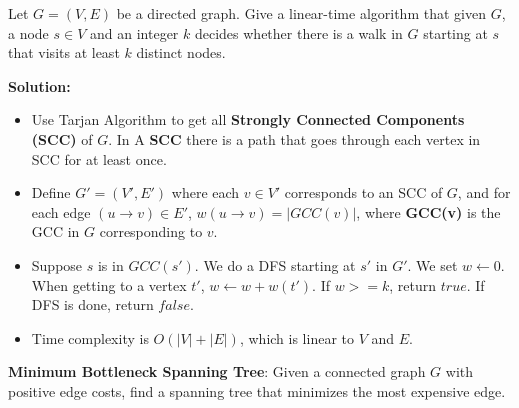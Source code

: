 \documentclass{article}
\newcounter{exercise}
\newcommand{\<}{
    \langle}
\renewcommand{\>}{
    \rangle}
\begin{document}
{\begin{exercise}
Let $G=(V,E)$ be a directed graph. Give a linear-time algorithm that given $G$, a node $s\in V$ and an integer $k$ decides whether there is a walk in $G$ starting at $s$ that visits at least $k$ distinct nodes.
\end{exercise}
\textbf{Solution:} 
    \begin{itemize}
        \item Use Tarjan Algorithm to get all \textbf{Strongly Connected Components (SCC)} of $G$. In A \textbf{SCC} there is a path that goes through each vertex in SCC for at least once.
        \item Define $G'=(V', E')$ where each $v\in V'$ corresponds to an SCC of $G$, and for each edge $(u\rightarrow v) \in E'$, $w(u\rightarrow v)=|GCC(v)|$, where \textbf{GCC(v)} is the GCC in $G$ corresponding to $v$.
        \item Suppose $s$ is in $GCC(s')$. We do a DFS starting at $s'$ in $G'$. We set $w\leftarrow 0$. When getting to a vertex $t'$, $w\leftarrow w+w(t')$. If $w>=k$, return $true$. If DFS is done, return $false$.
        \item Time complexity is $O(|V|+|E|)$, which is linear to $V$ and $E$.
    \end{itemize}





\begin{exercise}
\textbf{Minimum Bottleneck Spanning Tree}: Given a connected graph $ G $ with positive edge costs, find a
spanning tree that {minimizes the most expensive edge}.
\end{exercise}

}
\end{document}
